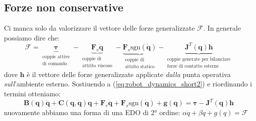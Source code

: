 \subsection{Forze non conservative}
Ci manca solo da valorizzare il vettore delle forze generalizzate $\bm{\mathcal{F}}$. In generale possiamo dire che:
$$
\bm{\mathcal{F}}
=
\underbrace{\bm{\tau}}_{\substack{\text{coppie attive} \\ \text{di comando}}}
-
\underbrace{\bm{F}_v\dot{\bm{q}}}_{\substack{\text{coppie di} \\ \text{attrito viscoso}}}
-
\underbrace{\bm{F}_s \text{sgn}(\dot{\bm{q}}) }_{\substack{\text{coppie di} \\ \text{attrito statico}}}
-
\underbrace{\bm{J}^T(\bm{q}) \bm{h}}_{\substack{\text{coppie generate per bilanciare} \\ \text{forze di contatto esterne}}}
$$
dove $\bm{h}$ è il vettore delle forze generalizzate applicate \textit{dalla} punta operativa \textit{sull}’ambiente esterno.
Sostiuendo a (\ref{eq:robot_dynamics_short2}) e riordinando i termini otteniamo:
\begin{equation}\label{eq:robot_dynamics_short_complete}
	\boxed{
		\bm{B}(\bm{q})\bm{\ddot{q}} + \bm{C}(\bm{q}, \bm{\dot{q}})\bm{q}		+
		\bm{F}_v\dot{\bm{q}} 
		+
		\bm{F}_s \text{sgn}(\dot{\bm{q}})
		+
		\bm{g}(\bm{q})
		= 
		\bm{\tau}
		-
		\bm{J}^T(\bm{q}) \bm{h}
	}
\end{equation}
nuovamente abbiamo una forma di una EDO di 2° ordine: $\alpha\ddot{q} + \beta \dot{q} + g(q) = \mathcal{F}$
